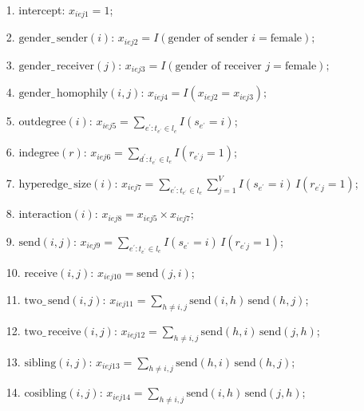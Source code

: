 \documentclass[ba]{imsart}
\numberwithin{equation}{section}
\theoremstyle{plain}
\begin{document}
	\begin{itemize}
		\item[1.] intercept: ${x}_{iej1} =1$;
		\item[2.] $\mbox{gender}\_\,\mbox{sender}(i)$: ${x}_{iej2} = I(\mbox{gender of sender } i= \mbox{female});$
		\item[3.] $\mbox{gender}\_\,\mbox{receiver}(j)$: ${x}_{iej3} = I(\mbox{gender of receiver } j= \mbox{female});$
		\item[4.] $\mbox{gender}\_\,\mbox{homophily}(i, j)$: ${x}_{iej4} = I({x}_{iej2}={x}_{iej3});$ 	   		
		\item[5.] $\mbox{outdegree}(i)$: ${x}_{iej5} =\sum_{e^\prime: t_{e^\prime} \in l_e} I(s_{e^\prime} = i)$;
		\item[6.] $\mbox{indegree}(r)$: ${x}_{iej6}=\sum_{d^\prime: t_{e^\prime} \in l_e} I(r_{e^\prime j} = 1)$;
		\item[7.] $\mbox{hyperedge}\_\,\mbox{size}(i)$: ${x}_{iej7}=\sum_{e^\prime: t_{e^\prime} \in l_e} \sum_{j=1}^V I(s_{e^\prime} = i)\,I(r_{e^\prime j} = 1)$;
		\item[8.] $\mbox{interaction}(i)$: ${x}_{iej8} = {x}_{iej5}\times{x}_{iej7};$
		\item[9.] $\mbox{send}(i, j)$: ${x}_{iej9}=\sum_{e^\prime: t_{e^\prime} \in l_e} I(s_{e^\prime} = i)\,I(r_{e^\prime j} = 1)$;
		\item[10.] $\mbox{receive}(i,j)$: ${x}_{iej10}=\mbox{send}(j,i)$;
		\item[11.] $\mbox{two}\_\,\mbox{send}(i,j)$: ${x}_{iej11} = \sum_{h \neq i,j} \mbox{send}(i,h)\,\mbox{send}(h,j)$;
		\item[12.] $\mbox{two}\_\,\mbox{receive}(i,j)$: ${x}_{iej12}= \sum_{h \neq i, j} \mbox{send}(h,i)\,\mbox{send}(j,h)$;
		\item[13.] $\mbox{sibling}(i, j)$: ${x}_{iej13}=\sum_{h \neq i, j} \mbox{send}(h,i)\,\mbox{send}(h,j)$;
		\item[14.] $\mbox{cosibling}(i, j)$: ${x}_{iej14}=\sum_{h \neq i,j} \mbox{send}(i,h)\,\mbox{send}(j,h)$;
	\end{itemize}
\end{document}
